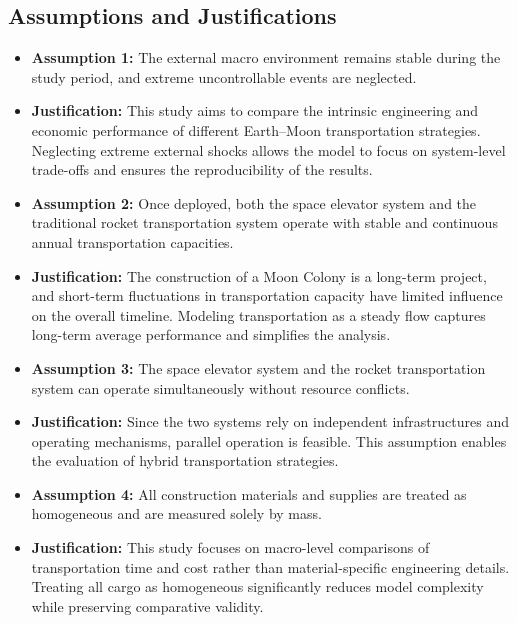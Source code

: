 \documentclass[12pt]{mcmthesis}
\begin{document}
\subsection{Assumptions and Justifications}
\begin{itemize}

    \item \textbf{Assumption 1:}
          The external macro environment remains stable during the study period, and extreme uncontrollable events are neglected.

    \item \textbf{Justification:}
          This study aims to compare the intrinsic engineering and economic performance of different Earth--Moon transportation strategies. Neglecting extreme external shocks allows the model to focus on system-level trade-offs and ensures the reproducibility of the results.

    \item \textbf{Assumption 2:}
          Once deployed, both the space elevator system and the traditional rocket transportation system operate with stable and continuous annual transportation capacities.

    \item \textbf{Justification:}
          The construction of a Moon Colony is a long-term project, and short-term fluctuations in transportation capacity have limited influence on the overall timeline. Modeling transportation as a steady flow captures long-term average performance and simplifies the analysis.

    \item \textbf{Assumption 3:}
          The space elevator system and the rocket transportation system can operate simultaneously without resource conflicts.

    \item \textbf{Justification:}
          Since the two systems rely on independent infrastructures and operating mechanisms, parallel operation is feasible. This assumption enables the evaluation of hybrid transportation strategies.

    \item \textbf{Assumption 4:}
          All construction materials and supplies are treated as homogeneous and are measured solely by mass.

    \item \textbf{Justification:}
          This study focuses on macro-level comparisons of transportation time and cost rather than material-specific engineering details. Treating all cargo as homogeneous significantly reduces model complexity while preserving comparative validity.


\end{itemize}
\end{document}
